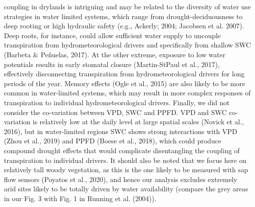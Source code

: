 \documentclass[11pt,twoside]{reedthesis}
\begin{document}
coupling in drylands is intriguing and may be related to the diversity
of water use strategies in water limited systems, which range from
drought-deciduousness to deep rooting or high hydraulic safety (e.g.,
Ackerly; 2004; Jacobsen et al. 2007). Deep roots, for instance, could
allow sufficient water supply to uncouple transpiration from
hydrometeorological drivers and specifically from shallow SWC (Barbeta
\& Peñuelas, 2017). At the other extreme, exposure to low water
potentials results in early stomatal closure (Martin-StPaul et al.,
2017), effectively disconnecting transpiration from hydrometeorological
drivers for long periods of the year. Memory effects (Ogle et al., 2015)
are also likely to be more common in water-limited systems, which may
result in more complex responses of transpiration to individual
hydrometeorological drivers. Finally, we did not consider the
co-variation between VPD, SWC and PPFD. VPD and SWC co-variation is
relatively low at the daily level at large spatial scales (Novick et
al., 2016), but in water-limited regions SWC shows strong interactions
with VPD (Zhou et al., 2019) and PPFD (Boese et al., 2018), which could
produce compound drought effects that would complicate disentangling the
coupling of transpiration to individual drivers. It should also be noted
that we focus here on relatively tall woody vegetation, as this is the
one likely to be measured with sap flow sensors (Poyatos et al., 2020),
and hence our analysis excludes extremely arid sites likely to be
totally driven by water availability (compare the grey areas in our Fig.
3 with Fig. 1 in Running et al. (2004)).\par
\end{document}
